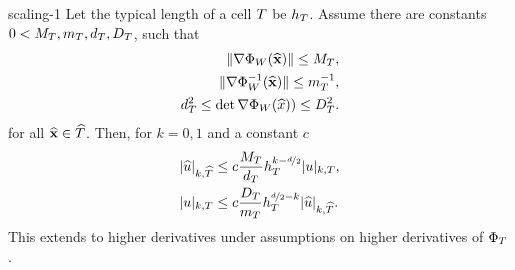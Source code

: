 \begin{Lemma}{scaling-1}
  Let the typical length of a cell $T$ be $h_T$. Assume there
  are constants $0 < M_T, m_T, d_T, D_T$, such that
  \begin{gather}
    \begin{split}
      \lVert\nabla\Phi_W(\widehat{\mathbf x})\rVert \le M_T,
      \\
      \lVert\nabla\Phi_W^{-1}(\widehat{\mathbf x})\rVert \le m_T^{-1} ,
      \\
      d^2_T \le \det \nabla\Phi_W(\widehat{x})) \le D^2_T.      
    \end{split}
  \end{gather}
  for all $\widehat{\mathbf x}\in\widehat {T}$. Then, for $k=0,1$ and a constant $c$
  \begin{gather}
    \begin{split}
      \lvert\widehat{u}\rvert_{k,\widehat {T}}
      &\le c \frac{M_T}{d_T}  h_T^{k-\nicefrac d2}
      \lvert u\rvert_{k,T},\\
      \lvert u\rvert_{k,T}
      &\le c \frac{D_T}{m_T} h_T^{\nicefrac d2-k}
      \lvert\widehat{u}\rvert_{k,\widehat {T}}.
    \end{split}
  \end{gather}
  This extends to higher derivatives under assumptions on higher
  derivatives of $\Phi_T$.
\end{Lemma}

